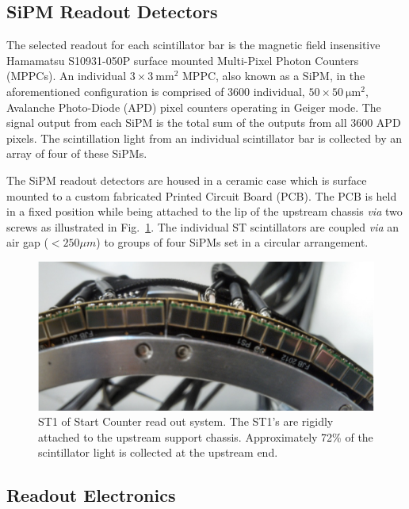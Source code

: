 \subsection{SiPM Readout Detectors}

The selected readout for each scintillator bar is the magnetic field insensitive Hamamatsu S10931-050P surface mounted Multi-Pixel Photon Counters (MPPCs)\cite{hamamatsu}.  An individual $\mathrm{3 \times 3\ mm^2}$ MPPC, also known as a SiPM, in the aforementioned configuration is comprised of 3600 individual, $\mathrm{50 \times 50\ \mu m^2}$, Avalanche Photo-Diode (APD) pixel counters operating in Geiger mode. The signal output from each SiPM is the total sum of the outputs from all 3600 APD pixels\cite{sipm_spec}.  The scintillation light from an individual scintillator bar is collected by an array of four of these SiPMs.

The SiPM readout detectors are housed in a ceramic case which is surface mounted to a custom fabricated Printed Circuit Board (PCB).  The PCB is held in a fixed position while being attached to the lip of the upstream chassis \emph{via} two screws as illustrated in Fig.~\ref{fig:st1_mounted}.  The individual ST scintillators are coupled \emph{via} an air gap ($< 250 \mu m$) to groups of four SiPMs set in a circular arrangement.
\begin{figure}[!htb]
	\centering
	\includegraphics[width=1.0\columnwidth]{design/figs/st1_mounted}
	\caption{ST1 of Start Counter read out system. The ST1's are rigidly attached to the upstream support chassis.  Approximately 72\% of the scintillator light is collected at the upstream end.}
	\label{fig:st1_mounted}
\end{figure}

\subsection{Readout Electronics}

